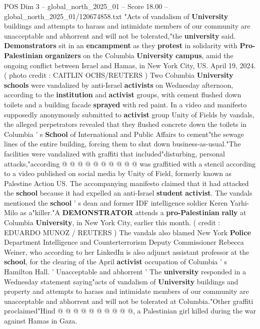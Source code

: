 \begin{textsample}{POS Dim 3 – global\_north\_2025\_01 – Score 18.00 – global\_north\_2025\_01/120674858.txt}  \label{ex:f3_pos_261}
"Acts of vandalism of \textbf{University} buildings and attempts to harass and intimidate members of our community are unacceptable and abhorrent and will not be tolerated,"the \textbf{university} said. \textbf{Demonstrators} sit in an \textbf{encampment} as they \textbf{protest} in solidarity with \textbf{Pro-Palestinian} \textbf{organizers} on the Columbia \textbf{University} \textbf{campus}, amid the ongoing conflict between Israel and Hamas, in New York City, US.
April 19, 2024. ( photo credit : CAITLIN OCHS/REUTERS ) Two Columbia \textbf{University} \textbf{schools} were vandalized by anti-Israel \textbf{activists} on Wednesday afternoon, according to the \textbf{institution} and \textbf{activist} groups, with cement flushed down toilets and a building facade \textbf{sprayed} with red paint.
In a video and manifesto supposedly anonymously submitted to \textbf{activist} group Unity of Fields by vandals, the alleged perpetrators revealed that they flushed concrete down the toilets in Columbia ' s \textbf{School} of International and Public Affairs to cement"the sewage lines of the entire building, forcing them to shut down business-as-usual."The facilities were vandalized with graffiti that included"disturbing, personal attacks,"according @ @ @ @ @ @ @ @ @ @ was graffitied with a stencil according to a video published on social media by Unity of Field, formerly known as Palestine Action US.
The accompanying manifesto claimed that it had attacked the \textbf{school} because it had expelled an anti-Israel \textbf{student} \textbf{activist}.
The vandals mentioned the \textbf{school} ' s dean and former IDF intelligence soldier Keren Yarhi-Milo as a"killer."A \textbf{DEMONSTRATOR} attends a \textbf{pro-Palestinian} \textbf{rally} at Columbia \textbf{University}, in New York City, earlier this month. ( credit : EDUARDO MUNOZ / REUTERS ) The vandals also blamed New York \textbf{Police} Department Intelligence and Counterterrorism Deputy Commissioner Rebecca Weiner, who according to her LinkedIn is also adjunct assistant professor at the \textbf{school}, for the clearing of the April \textbf{activist} occupation of Columbia ' s Hamilton Hall. ' Unacceptable and abhorrent ' The \textbf{university} responded in a Wednesday statement saying"acts of vandalism of \textbf{University} buildings and property and attempts to harass and intimidate members of our community are unacceptable and abhorrent and will not be tolerated at Columbia."Other graffiti proclaimed"Hind @ @ @ @ @ @ @ @ @ @, a Palestinian girl killed during the war against Hamas in Gaza.

\end{textsample}
